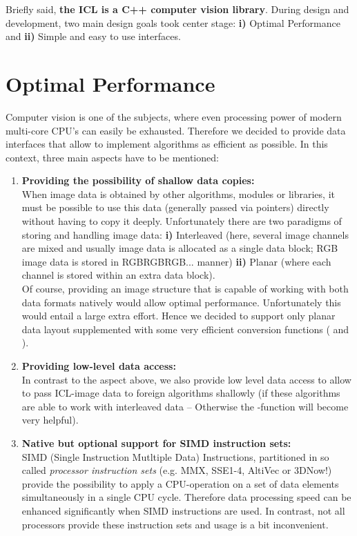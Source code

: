 Briefly said, \textbf{the ICL is a C++ computer vision library}. During design and development, two main design goals took center stage: \small{\textbf{i)}} Optimal Performance and \small{\textbf{ii)}} Simple and easy to use interfaces.
\section{Optimal Performance} 
Computer vision is one of the subjects, where even processing power of modern multi-core CPU's can easily be exhausted. Therefore we decided to provide data interfaces that allow to implement algorithms as efficient as possible. In this context, three main aspects have to be mentioned:
\begin{enumerate}
\item \textbf{Providing the possibility of shallow data copies:}\\
When image data is obtained by other algorithms, modules or libraries, it must be possible to use this data (generally passed via pointers) directly without having to copy it deeply. Unfortunately there are two paradigms of storing and handling image data: \small{\textbf{i)}} Interleaved (here, several image channels are mixed and usually image data is allocated as a single data block; RGB image data is stored in RGBRGBRGB... manner) \small{\textbf{ii)}} Planar (where each channel is stored within an extra data block).\\
Of course, providing an image structure that is capable of working with both data formats natively would allow optimal performance. Unfortunately this would entail a large extra effort. Hence we decided to support only planar data layout supplemented with some very efficient conversion functions ( and ).
\item \textbf{Providing low-level data access:}\\
In contrast to the aspect above, we also provide low level data access to allow to pass ICL-image data to foreign algorithms shallowly (if these algorithms are able to work with interleaved data -- Otherwise the -function will become very helpful).
\item \textbf{Native but optional support for SIMD instruction sets:}\\
SIMD (Single Instruction Mutltiple Data) Instructions, partitioned in so called \emph{processor instruction sets} (e.g. MMX, SSE1-4, AltiVec or 3DNow!) provide the possibility to apply a CPU-operation on a set of data elements simultaneously in a single CPU cycle. Therefore data processing speed can be enhanced significantly when SIMD instructions are used. In contrast, not all processors provide these instruction sets and usage is a bit inconvenient.\\

\end{enumerate}
